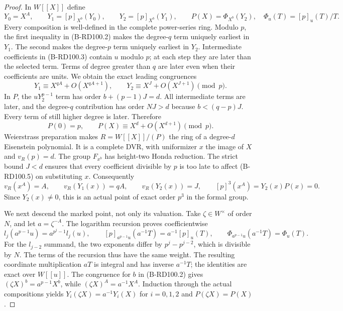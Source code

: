 \begin{proof}
In $W[[X]]$ define
\[
 Y_0=X^A,\qquad
 Y_1=[p]_{X^b}(Y_0),\qquad
 Y_2=[p]_{X^b}(Y_1),\qquad
 P(X)=\Phi_{X^b}(Y_2),\quad \Phi_u(T)=[p]_u(T)/T .
                                                        \tag{B-RD100.4}
\]
Every composition is well-defined in the complete power-series
ring. Modulo $p$, the first inequality in (B-RD100.2)
makes the degree-$q$ term uniquely earliest in $Y_1$.
The second makes the degree-$p$ term uniquely earliest in
$Y_2$. Intermediate coefficients in (B-RD100.3) contain $u$
modulo $p$; at each step they are later than the selected term.
Terms of degree greater than $q$ are later even when their
coefficients are units. We obtain the exact leading congruences
\[
 Y_1\equiv X^{qA}+O(X^{qA+1}),\qquad
 Y_2\equiv X^J+O(X^{J+1})\pmod p .
                                                        \tag{B-RD100.5}
\]
In $P$, the $uY_2^{p-1}$ term has order
$b+(p-1)J=d$. All intermediate terms are later, and the
degree-$q$ contribution has order $NJ>d$ because
$b<(q-p)J$. Every term of still higher degree is later.
Therefore
\[
             P(0)=p,\qquad P(X)\equiv X^d+O(X^{d+1})\pmod p.
                                                        \tag{B-RD100.6}
\]
Weierstrass preparation makes $R=W[[X]]/(P)$ the ring
of a degree-$d$ Eisenstein polynomial. It is a complete DVR,
with uniformizer $x$ the image of $X$ and $v_R(p)=d$.
The group $F_{x^b}$ has height-two Honda reduction.
The strict bound $J<d$ ensures that every coefficient
divisible by $p$ is too late to affect (B-RD100.5) on
substituting $x$. Consequently
\[
 v_R(x^A)=A,\qquad v_R(Y_1(x))=qA,\qquad
 v_R(Y_2(x))=J,\qquad [p]^3(x^A)=Y_2(x)P(x)=0 .
                                                        \tag{B-RD100.7}
\]
Since $Y_2(x)\ne0$, this is an actual point of exact order
$p^3$ in the formal group.

We next descend the marked point, not only its valuation.
Take $\zeta\in W^\times$ of order $N$, and let $a=\zeta^{-A}$.
The logarithm recursion proves coefficientwise
\[
 l_j(a^{p-1}u)=a^{p^j-1}l_j(u),\qquad
 [p]_{a^{p-1}u}(a^{-1}T)=a^{-1}[p]_u(T),\qquad
 \Phi_{a^{p-1}u}(a^{-1}T)=\Phi_u(T).
                                                        \tag{B-RD100.8}
\]
For the $l_{j-2}$ summand, the two exponents differ by
$p^j-p^{j-2}$, which is divisible by $N$. The terms of
the recursion thus have the same weight. The resulting
coordinate multiplication $aT$ is integral and has inverse
$a^{-1}T$; the identities are exact over $W[[u]]$.
The congruence for $b$ in (B-RD100.2) gives
$(\zeta X)^b=a^{p-1}X^b$, while
$(\zeta X)^A=a^{-1}X^A$.
Induction through the actual compositions yields
$Y_i(\zeta X)=a^{-1}Y_i(X)$ for $i=0,1,2$ and
$P(\zeta X)=P(X)$.


\end{proof}
